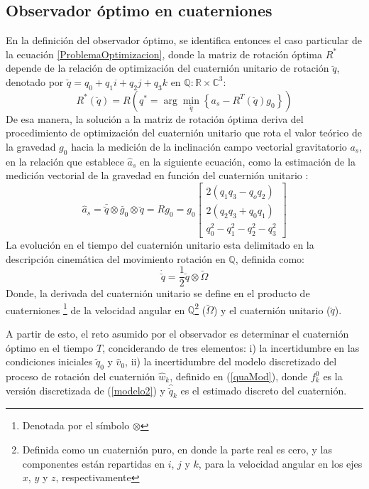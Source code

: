 \documentclass[conference]{IEEEtran}
\begin{document}
\subsection{Observador óptimo en cuaterniones}
En la definición del observador óptimo, se identifica entonces el caso particular de la ecuación \ref{ProblemaOptimizacion}, donde la matriz de rotación óptima $R^*$ depende de la relación de optimización del cuaternión unitario de rotación $\breve{q}$, denotado por $\breve{q}=q_0+q_1i+q_2j+q_3k$ en $\mathbb{Q}:\mathbb{R}\times\mathbb{C}^3$:
\begin{equation}\label{ProblemaOptimizacionAcc}
R^*(\breve{q})=R\left(q^*=\arg\min_{\breve{q}}\left\{a_s-R^T(\breve{q})g_0\right\}\right)
\end{equation} 
De esa manera, la solución a la matriz de rotación óptima deriva del procedimiento  de optimización del cuaternión unitario que rota el valor teórico de la gravedad $g_0$ hacia la medición de la inclinación campo vectorial gravitatorio $a_s$, en la relación que establece $\hat{a}_s$ en la siguiente ecuación, como la estimación de la medición vectorial de la gravedad en función del cuaternión unitario \cite{Sola2012}:
\begin{equation}\label{chap2:ModeloMedicion}
\hat{a}_s=\bar{\breve{q}}\otimes\breve{g_0}\otimes\breve{q}=Rg_0=g_0\begin{bmatrix}2(q_1q_3-q_oq_2)\\2(q_2q_3+q_0q_1)\\q_0^2-q_1^2-q_2^2-q_3^2\end{bmatrix}
\end{equation}
La evolución en el tiempo del cuaternión unitario esta delimitado en la descripción cinemática del movimiento rotación en $\mathbb{Q}$, definida como:
\begin{equation}\label{modelo2}
\dot{\breve{q}}=\frac{1}{2}\breve{q}\otimes\breve{\Omega}
\end{equation}
Donde, la derivada del cuaternión unitario se define en el producto de cuaterniones \footnote{Denotada por el símbolo $\otimes$} de la velocidad angular en $\mathbb{Q}$\footnote{Definida como un cuaternión puro, en donde la parte real es cero, y las componentes están repartidas en $i$, $j$ y $k$, para la velocidad angular en los ejes $x$, $y$ y $z$, respectivamente} ($\breve{\Omega}$) y el cuaternión unitario ($\breve{q}$).\par
A partir de esto, el reto asumido por el observador es determinar el cuaternión óptimo en el tiempo $T$, conciderando de tres elementos: i) la incertidumbre en las condiciones iniciales $\tilde{q}_0$ y $\hat{v}_0$, ii) la incertidumbre del modelo discretizado del proceso de rotación del cuaternión $\hat{w}_k$, definido en (\ref{quaMod}), donde $f^0_k$ es la versión discretizada de (\ref{modelo2}) y $\hat{\breve{q}}_{k}$ es el estimado discreto del cuaternión.
\end{document}
